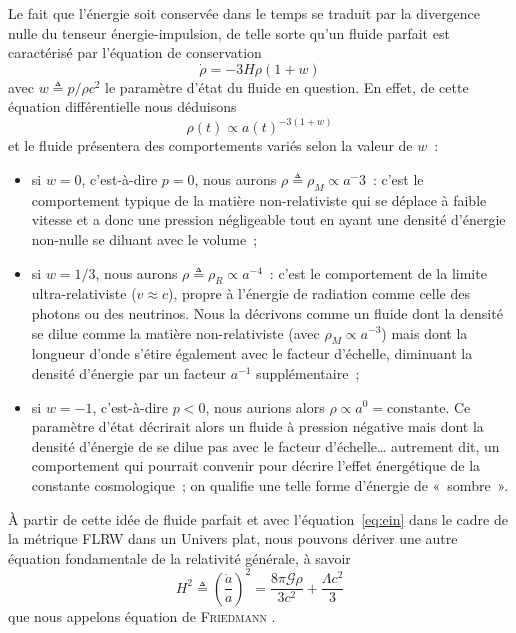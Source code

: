 \documentclass[../main/main.tex]{subfiles}
\begin{document}
Le fait que l'énergie soit conservée dans le temps se traduit par la divergence
nulle du tenseur énergie-impulsion, de telle sorte qu'un fluide parfait est
caractérisé par l'équation de conservation
\begin{equation}\label{eq:cons}
    \dot{\rho} = -3H\rho(1+w)
\end{equation}
avec $w \triangleq p/\rho c^2$ le paramètre d'état du fluide en question. En
effet, de cette équation différentielle nous déduisons
\begin{equation}\label{eq:rho}
    \rho(t) \propto a(t)^{-3(1+w)}
\end{equation}
et le fluide présentera des comportements variés selon la valeur de $w$~:
\begin{itemize}
    \item si $w=0$, c'est-à-dire $p=0$, nous aurons $\rho \triangleq \rho_M
        \propto a^-3$~: c'est le comportement typique de la matière
        non-relativiste qui se déplace à faible vitesse et a donc une pression
        négligeable tout en ayant une densité d'énergie non-nulle se diluant
        avec le volume~;

    \item si $w=1/3$, nous aurons $\rho \triangleq \rho_R \propto a^{-4}$~:
        c'est le comportement de la limite ultra-relativiste ($v \approx c$),
        propre à l'énergie de radiation comme celle des photons ou des
        neutrinos. Nous la décrivons comme un fluide dont la densité se dilue
        comme la matière non-relativiste (avec $\rho_M \propto a^{-3}$) mais
        dont la longueur d'onde s'étire également avec le facteur d'échelle,
        diminuant la densité d'énergie par un facteur $a^{-1}$ supplémentaire~;

    \item si $w=-1$, c'est-à-dire $p < 0$, nous aurions alors $\rho \propto a^0
        = \text{constante}$. Ce paramètre d'état décrirait alors un fluide à
        pression négative mais dont la densité d'énergie de se dilue pas avec le
        facteur d'échelle… autrement dit, un comportement qui pourrait convenir
        pour décrire l'effet énergétique de la constante cosmologique~; on
        qualifie une telle forme d'énergie de «~sombre~».
\end{itemize}

À partir de cette idée de fluide parfait et avec l'équation~\ref{eq:ein} dans le
cadre de la métrique FLRW dans un Univers plat, nous pouvons dériver une autre
équation fondamentale de la relativité générale, à savoir
\begin{equation}\label{eq:fried}
    H^2 \triangleq \left( \frac{\dot{a}}{a} \right)^2 =
    \frac{8\pi\mathcal{G}\rho}{3c^2} + \frac{\Lambda c^2}{3}
\end{equation}
que nous appelons équation de \textsc{Friedmann} \citep{friedmann1922}.
\end{document}
